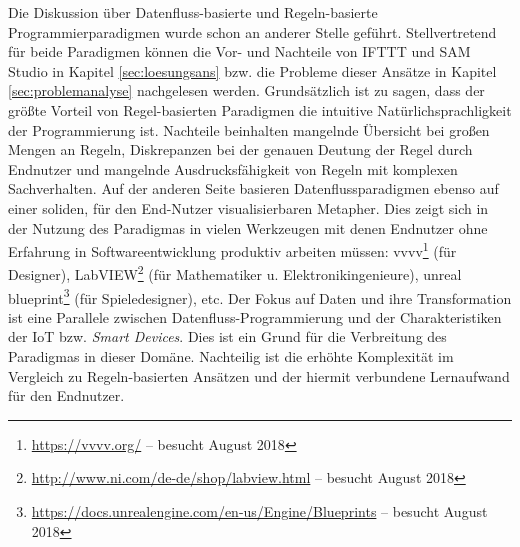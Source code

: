 Die Diskussion über Datenfluss-basierte und Regeln-basierte Programmierparadigmen wurde schon an anderer Stelle geführt. Stellvertretend für beide Paradigmen können die Vor- und Nachteile von IFTTT und SAM Studio in Kapitel \ref{sec:loesungsans} bzw. die Probleme dieser Ansätze in Kapitel \ref{sec:problemanalyse} nachgelesen werden. Grundsätzlich ist zu sagen, dass der größte Vorteil von Regel-basierten Paradigmen die intuitive Natürlichsprachligkeit der Programmierung ist. Nachteile beinhalten mangelnde Übersicht bei großen Mengen an Regeln, Diskrepanzen bei der genauen Deutung der Regel durch Endnutzer und mangelnde Ausdrucksfähigkeit von Regeln mit komplexen Sachverhalten. Auf der anderen Seite basieren Datenflussparadigmen ebenso auf einer soliden, für den End-Nutzer visualisierbaren Metapher. Dies zeigt sich in der Nutzung des Paradigmas in vielen Werkzeugen mit denen Endnutzer ohne Erfahrung in Softwareentwicklung produktiv arbeiten müssen: vvvv\footnote{\url{https://vvvv.org/} -- besucht August 2018} (für Designer), LabVIEW\footnote{\url{http://www.ni.com/de-de/shop/labview.html} -- besucht August 2018} (für Mathematiker u. Elektronikingenieure), unreal blueprint\footnote{\url{https://docs.unrealengine.com/en-us/Engine/Blueprints} -- besucht August 2018} (für Spieledesigner), etc. Der Fokus auf Daten und ihre Transformation ist eine Parallele zwischen Datenfluss-Programmierung und der Charakteristiken der \ac{IoT} bzw. \textit{Smart Devices}. Dies ist ein Grund für die Verbreitung des Paradigmas in dieser Domäne. Nachteilig ist die erhöhte Komplexität im Vergleich zu Regeln-basierten Ansätzen und der hiermit verbundene Lernaufwand für den Endnutzer.

